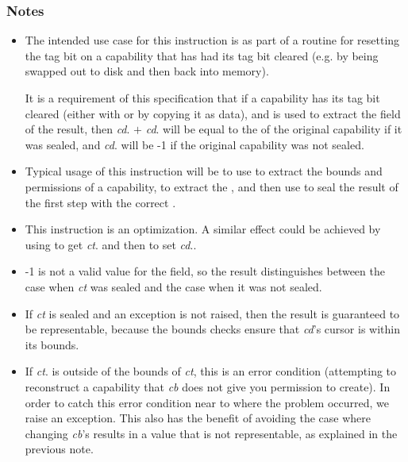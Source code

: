 \subsubsection*{Notes}

\begin{itemize}
\item
The intended use case for this instruction is as part of a routine for
resetting the tag bit on a capability that has had its tag bit cleared
(e.g. by being swapped out to disk and then back into memory).

It is a requirement of this specification that if a capability has its
tag bit cleared (either with  or by copying it as
data), and  is used to extract the \cotype{} field
of the result, then \emph{cd}.\cbase{} $+$ \emph{cd}.\coffset{} will be
equal to the \cotype{} of the original capability if it was sealed,
and \emph{cd}.\coffset{} will be -1 if the original capability was not
sealed.
\item
Typical usage of this instruction will be to use  to
extract the bounds and permissions of a capability, 
to extract the \cotype{}, and then use  to seal the
result of the first step with the correct \cotype{}.
\item
This instruction is an optimization. A similar effect could be achieved by
using  to get \emph{ct}.\cotype{} and then
 to set \emph{cd}.\coffset{}.
\item
-1 is not a valid value for the \cotype{} field, so the result distinguishes
between the case when \emph{ct} was sealed and the case when it was not
sealed.
\item
If \emph{ct} is sealed and an exception is not raised, then the result is
guaranteed to be representable, because the bounds checks ensure that
\emph{cd}'s cursor is within its bounds.
\item
If \emph{ct}.\cotype{} is outside of the bounds of \emph{ct}, this is an
error condition (attempting to reconstruct a capability that \emph{cb} does
not give you permission to create). In order to catch this error condition
near to where the problem occurred, we raise an exception. This also has
the benefit of avoiding the case where changing \emph{cb}'s \coffset{}
results in a value that is not representable, as explained in the previous
note.
\end{itemize}

